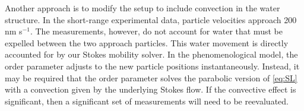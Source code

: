 Another approach is to modify the setup to include convection in the water structure. 
In the short-range experimental data, particle velocities approach 200 nm s$^{-1}$.
The measurements, however, do not account for water that must be 
expelled between the two approach particles. This water movement is directly 
accounted for by our Stokes mobility solver.  In the phenomenological model,
the order parameter adjusts to the new particle positions instantaneously.  Instead,
it may be required that the order parameter solves the parabolic version of \eqref{eq:SL}
with a convection given by the underlying Stokes flow. 
If the convective effect is significant, then a significant 
set of measurements will need to be reevaluated.

%
%
%

